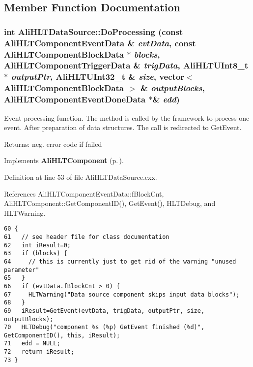 \subsection{Member Function Documentation}
\subsubsection{\setlength{\rightskip}{0pt plus 5cm}int Ali\-HLTData\-Source::Do\-Processing (const {\bf Ali\-HLTComponent\-Event\-Data} \& {\em evt\-Data}, const {\bf Ali\-HLTComponent\-Block\-Data} $\ast$ {\em blocks}, {\bf Ali\-HLTComponent\-Trigger\-Data} \& {\em trig\-Data}, {\bf Ali\-HLTUInt8\_\-t} $\ast$ {\em output\-Ptr}, {\bf Ali\-HLTUInt32\_\-t} \& {\em size}, vector$<$ {\bf Ali\-HLTComponent\-Block\-Data} $>$ \& {\em output\-Blocks}, {\bf Ali\-HLTComponent\-Event\-Done\-Data} $\ast$\& {\em edd})\hspace{0.3cm}{\tt  [virtual]}}\label{classAliHLTDataSource_a2}


Event processing function. The method is called by the framework to process one event. After preparation of data structures. The call is redirected to Get\-Event. \begin{Desc}
\item[Returns:]neg. error code if failed \end{Desc}


Implements {\bf Ali\-HLTComponent} {\rm (p.\,\pageref{classAliHLTComponent_a7})}.

Definition at line 53 of file Ali\-HLTData\-Source.cxx.

References Ali\-HLTComponent\-Event\-Data::f\-Block\-Cnt, Ali\-HLTComponent::Get\-Component\-ID(), Get\-Event(), HLTDebug, and HLTWarning.

\footnotesize\begin{verbatim}60 {
61   // see header file for class documentation
62   int iResult=0;
63   if (blocks) {
64     // this is currently just to get rid of the warning "unused parameter"
65   }
66   if (evtData.fBlockCnt > 0) {
67     HLTWarning("Data source component skips input data blocks");
68   }
69   iResult=GetEvent(evtData, trigData, outputPtr, size, outputBlocks);
70   HLTDebug("component %s (%p) GetEvent finished (%d)", GetComponentID(), this, iResult);
71   edd = NULL;
72   return iResult;
73 }
\end{verbatim}\normalsize 


